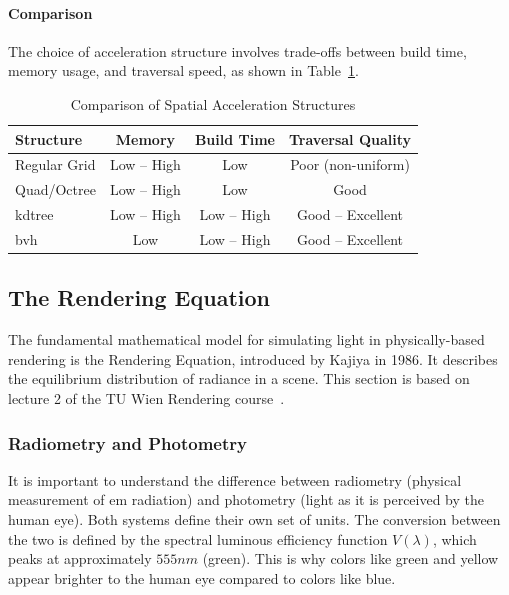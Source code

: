 \paragraph{Comparison}\label{par:comparison}

The choice of acceleration structure involves trade-offs between build time, memory usage, and traversal speed,
as shown in Table~\ref{tab:comparison-of-as}.

\begin{table}[h]
    \centering
    \caption{Comparison of Spatial Acceleration Structures\cite{tuwien_rendering_2020}}
    \label{tab:comparison-of-as}
    \begin{tabular}{lccc}
        \toprule
        \textbf{Structure} & \textbf{Memory} & \textbf{Build Time} & \textbf{Traversal Quality} \\
        \midrule
        Regular Grid & Low -- High & Low & Poor (non-uniform) \\
        Quad/Octree & Low -- High & Low & Good \\
        \gls{kdtree} & Low -- High & Low -- High & Good -- Excellent \\
        \gls{bvh} & Low & Low -- High & Good -- Excellent \\
        \bottomrule
    \end{tabular}
\end{table}

\subsection{The Rendering Equation}\label{subsec:rendering-equation}

The fundamental mathematical model for simulating light in physically-based rendering is the Rendering Equation,
introduced by Kajiya in 1986\cite{10.1145/15886.15902}.
It describes the equilibrium distribution of radiance in a scene.
This section is based on lecture 2 of the TU Wien Rendering course~\cite{tuwien_rendering_2020}.

\subsubsection{Radiometry and Photometry}\label{subsubsec:radiometry-photometry}

It is important to understand the difference between radiometry (physical measurement of \gls{em} radiation)
and photometry (light as it is perceived by the human eye).
Both systems define their own set of units.
The conversion between the two is defined by the spectral luminous efficiency function $V(\lambda)$,
which peaks at approximately $555nm$ (green).
This is why colors like green and yellow appear brighter to the human eye compared to colors like blue.

